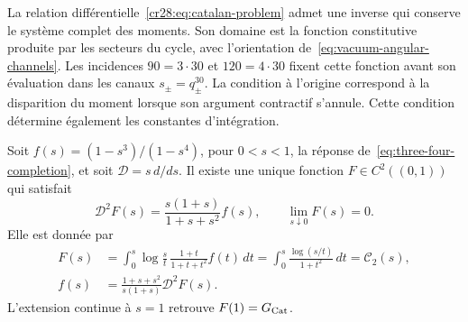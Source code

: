 La relation différentielle~\eqref{cr28:eq:catalan-problem} admet une inverse qui conserve le système complet des moments. Son domaine est la fonction constitutive produite par les secteurs du cycle, avec l'orientation de~\eqref{eq:vacuum-angular-channels}. Les incidences $90=3\cdot30$ et $120=4\cdot30$ fixent cette fonction avant son évaluation dans les canaux $s_\pm=q_\pm^{30}$. La condition à l'origine correspond à la disparition du moment lorsque son argument contractif s'annule. Cette condition détermine également les constantes d'intégration.

\begin{theorem}
\label{cr28:thm:catalan-recovery}
Soit $f(s)=(1-s^3)/(1-s^4)$, pour $0<s<1$, la réponse
de~\eqref{eq:three-four-completion}, et soit $\mathcal D=s\,d/ds$.
Il existe une unique fonction $F\in C^2((0,1))$ qui satisfait
\begin{equation}
 \mathcal D^2F(s)=\frac{s(1+s)}{1+s+s^2}f(s),
 \qquad \lim_{s\downarrow0}F(s)=0.
 \label{cr28:eq:catalan-problem}
\end{equation}
Elle est donnée par
\begin{align}
 F(s)&=\int_0^s\log\frac{s}{t}\,
          \frac{1+t}{1+t+t^2}f(t)\,dt
       =\int_0^s\frac{\log(s/t)}{1+t^2}\,dt
       =\mathcal C_2(s),
 \label{cr28:eq:catalan-integral}\\
 f(s)&=\frac{1+s+s^2}{s(1+s)}\mathcal D^2F(s).
 \label{cr28:eq:catalan-inverse}
\end{align}
L’extension continue à $s=1$ retrouve $F(1)=G_{\rm Cat}$.
\end{theorem}
